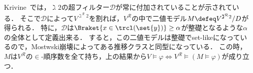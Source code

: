 \documentclass[realisability.tex]{subfiles}
\begin{document}
Krivine~\cite{Krivine:2014yu}では，$\gimel 2$の超フィルター$\mathcal{D}$が常に付加されていることが示されている．
そこで$\mathcal{D}$によって$V^{\gimel^{\mathcal{R}} 2}$を割れば，$V^{\mathcal{R}}$の中で二値モデル$M \defeq V^{\gimel^{\mathcal{R}} 2}/D$が得られる．
特に，$\mathcal{D}$は$\Braket{x \in \trcl(\set{y})} \geq \alpha$が整礎となるような$\alpha$の全体として定義出来る．
すると，この二値モデルは整礎でset-likeになっているので，Mostwski崩壊によってある推移クラスと同型になっている．
この時，$M$は$V^{\mathcal{R}}$の$\in$-順序数を全て持ち，上の結果から$V \models \varphi \iff V^{\mathcal{R}} \models (M \models \varphi)$が成り立つ．
\end{document}
